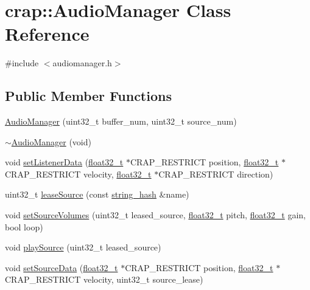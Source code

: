\hypertarget{classcrap_1_1_audio_manager}{\section{crap\+:\+:Audio\+Manager Class Reference}
\label{classcrap_1_1_audio_manager}
}


{\ttfamily \#include $<$audiomanager.\+h$>$}

\subsection*{Public Member Functions}
\begin{DoxyCompactItemize}
\item 
\hyperlink{classcrap_1_1_audio_manager_a446edb9c92c70f7667dad30d62cf74ac}{Audio\+Manager} (uint32\+\_\+t buffer\+\_\+num, uint32\+\_\+t source\+\_\+num)
\item 
\hyperlink{classcrap_1_1_audio_manager_a354d10d8577a6f3c9d8d121ef2c551dc}{$\sim$\+Audio\+Manager} (void)
\item 
void \hyperlink{classcrap_1_1_audio_manager_aaf4319fda2c8003de56fd7947b8a1363}{set\+Listener\+Data} (\hyperlink{crap__types_8h_a4611b605e45ab401f02cab15c5e38715}{float32\+\_\+t} $\ast$C\+R\+A\+P\+\_\+\+R\+E\+S\+T\+R\+I\+C\+T position, \hyperlink{crap__types_8h_a4611b605e45ab401f02cab15c5e38715}{float32\+\_\+t} $\ast$C\+R\+A\+P\+\_\+\+R\+E\+S\+T\+R\+I\+C\+T velocity, \hyperlink{crap__types_8h_a4611b605e45ab401f02cab15c5e38715}{float32\+\_\+t} $\ast$C\+R\+A\+P\+\_\+\+R\+E\+S\+T\+R\+I\+C\+T direction)
\item 
uint32\+\_\+t \hyperlink{classcrap_1_1_audio_manager_ac32b44b00640c4afaca9b77622889086}{lease\+Source} (const \hyperlink{classcrap_1_1string__hash}{string\+\_\+hash} \&name)
\item 
void \hyperlink{classcrap_1_1_audio_manager_a7f3ed79426556097ce33c3ca10ba2f65}{set\+Source\+Volumes} (uint32\+\_\+t leased\+\_\+source, \hyperlink{crap__types_8h_a4611b605e45ab401f02cab15c5e38715}{float32\+\_\+t} pitch, \hyperlink{crap__types_8h_a4611b605e45ab401f02cab15c5e38715}{float32\+\_\+t} gain, bool loop)
\item 
void \hyperlink{classcrap_1_1_audio_manager_a608671f0257d1db9204356ca25b69d76}{play\+Source} (uint32\+\_\+t leased\+\_\+source)
\item 
void \hyperlink{classcrap_1_1_audio_manager_ab4449ff51444a2f9ece308fa44fe8fbc}{set\+Source\+Data} (\hyperlink{crap__types_8h_a4611b605e45ab401f02cab15c5e38715}{float32\+\_\+t} $\ast$C\+R\+A\+P\+\_\+\+R\+E\+S\+T\+R\+I\+C\+T position, \hyperlink{crap__types_8h_a4611b605e45ab401f02cab15c5e38715}{float32\+\_\+t} $\ast$C\+R\+A\+P\+\_\+\+R\+E\+S\+T\+R\+I\+C\+T velocity, uint32\+\_\+t source\+\_\+lease)

\end{DoxyCompactItemize}
